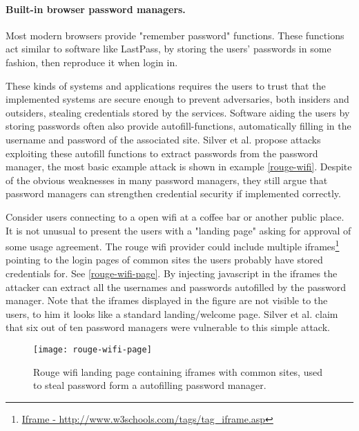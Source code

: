 \paragraph{Built-in browser password managers.} Most modern browsers provide "remember password" functions. These functions act similar to software like LastPass, by storing the users' passwords in some fashion, then reproduce it when login in. 

These kinds of systems and applications requires the users to trust that the implemented systems are secure enough to prevent adversaries, both insiders and outsiders, stealing credentials stored by the services. Software aiding the users by storing passwords often also provide autofill-functions, automatically filling in the username and password of the associated site. Silver et al. \cite{pw-managment-attacks} propose attacks exploiting these autofill functions to extract passwords from the password manager, the most basic example attack is shown in example \ref{rouge-wifi}. Despite of the obvious weaknesses in many password managers, they still argue that password managers can strengthen credential security if implemented correctly.  
\begin{example}\label{rouge-wifi}
    Consider users connecting to a open wifi at a coffee bar or another public place. It is not unusual to present the users with a "landing page" asking for approval of some usage agreement. The rouge wifi provider could include multiple iframes\footnote{\url{Iframe - http://www.w3schools.com/tags/tag_iframe.asp}} pointing to the login pages of common sites the users probably have stored credentials for. See \autoref{rouge-wifi-page}. By injecting javascript in the iframes the attacker can extract all the usernames and passwords autofilled by the password manager. Note that the iframes displayed in the figure are not visible to the users, to him it looks like a standard landing/welcome page. Silver et al. \cite{pw-managment-attacks} claim that six out of ten password managers were vulnerable to this simple attack.


\begin{figure}
    \texttt{[image: rouge-wifi-page]}
    \caption{Rouge wifi landing page containing iframes with common sites, used to steal password form a autofilling password manager.} 
    \label{rouge-wifi-page}
\end{figure}

\end{example}

